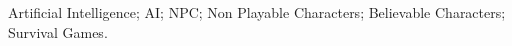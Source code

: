 \noindent Artificial Intelligence; AI; NPC; Non Playable Characters; Believable Characters; Survival Games.